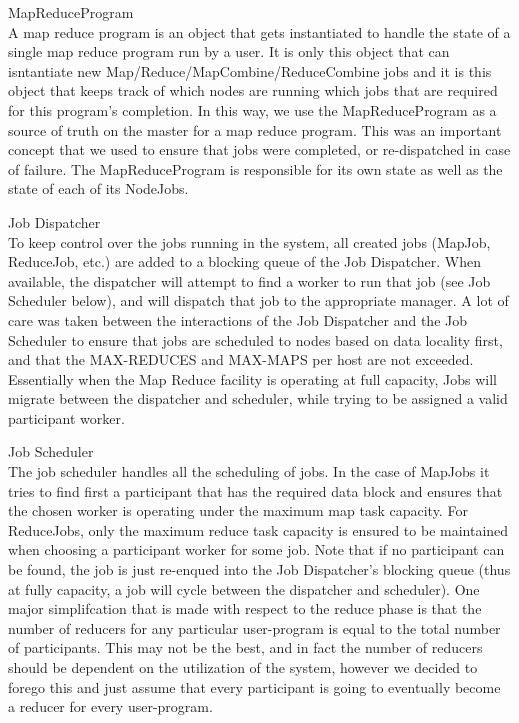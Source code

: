 \documentclass[11pt]{article}
\begin{document}
MapReduceProgram
\\ A map reduce program is an object that gets instantiated to handle the state of a single map reduce program run by a user. It is only this object that can isntantiate new Map/Reduce/MapCombine/ReduceCombine jobs and it is this object that keeps track of which nodes are running which jobs that are required for this program's completion. In this way, we use the MapReduceProgram as a source of truth on the master for a map reduce program. This was an important concept that we used to ensure that jobs were completed, or re-dispatched in case of failure. The MapReduceProgram is responsible for its own state as well as the state of each of its NodeJobs.

Job Dispatcher
\\ To keep control over the jobs running in the system, all created jobs (MapJob, ReduceJob, etc.) are added to a blocking queue of the Job Dispatcher. When available, the dispatcher will attempt to find a worker to run that job (see Job Scheduler below), and will dispatch that job to the appropriate manager. A lot of care was taken between the interactions of the Job Dispatcher and the Job Scheduler to ensure that jobs are scheduled to nodes based on data locality first, and that the MAX-REDUCES and MAX-MAPS per host are not exceeded. Essentially when the Map Reduce facility is operating at full capacity, Jobs will migrate between the dispatcher and scheduler, while trying to be assigned a valid participant worker.

Job Scheduler
\\ The job scheduler handles all the scheduling of jobs. In the case of MapJobs it tries to find first a participant that has the required data block and ensures that the chosen worker is operating under the maximum map task capacity. For ReduceJobs, only the maximum reduce task capacity is ensured to be maintained when choosing a participant worker for some job. Note that if no participant can be found, the job is just re-enqued into the Job Dispatcher's blocking queue (thus at fully capacity, a job will cycle between the dispatcher and scheduler). One major simplifcation that is made with respect to the reduce phase is that the number of reducers for any particular user-program is equal to the total number of participants. This may not be the best, and in fact the number of reducers should be dependent on the utilization of the system, however we decided to forego this and just assume that every participant is going to eventually become a reducer for every user-program.
\end{document}
